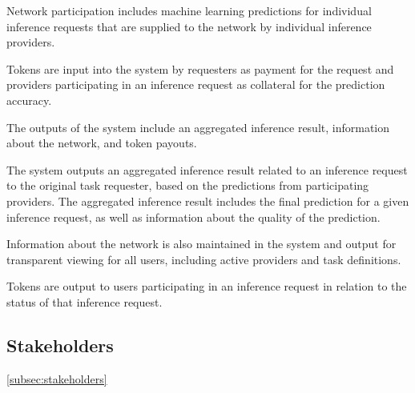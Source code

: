 \documentclass{article}
\begin{document}
Network participation includes machine learning predictions for individual inference requests that are 
supplied to the network by individual inference providers.

Tokens are input into the system by requesters as payment for the request and providers participating in an inference request as collateral for the prediction accuracy.


The outputs of the system include an aggregated inference result, information about the network, and token payouts.

The system outputs an aggregated inference result related to an inference request to the original task requester, 
based on the predictions from participating providers. 
The aggregated inference result includes the final prediction for a given inference request, as well as information 
about the quality of the prediction.

Information about the network is also maintained in the system and output for transparent viewing for all users, including 
active providers and task definitions.

Tokens are output to users participating in an inference request in relation to the status of that inference request.

\subsection{Stakeholders}
\ref{subsec:stakeholders}
\end{document}

